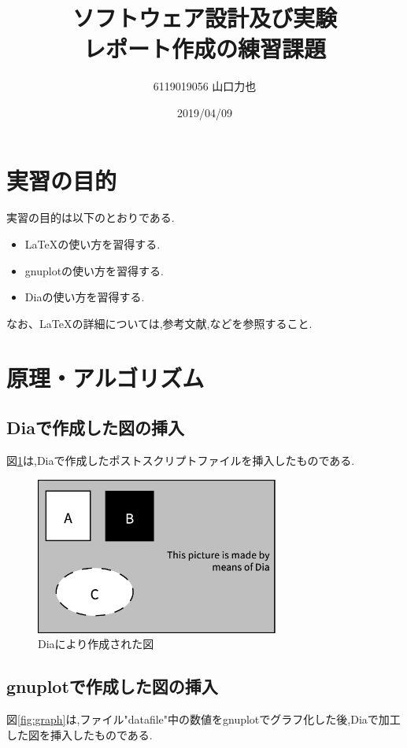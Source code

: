 \documentclass{jarticle}
\title{ソフトウェア設計及び実験\\レポート作成の練習課題}
\author{6119019056 山口力也}
\date{2019/04/09}
\begin{document}
\maketitle

\section{実習の目的}
実習の目的は以下のとおりである.\\
\begin{itemize}

\item \LaTeX の使い方を習得する.
\item gnuplotの使い方を習得する.
\item Diaの使い方を習得する.

\end{itemize}
なお、\LaTeX の詳細については,参考文献\cite{okumura},\cite{matsuda}などを参照すること.


\section{原理・アルゴリズム}
\subsection{Diaで作成した図の挿入}
図\ref{fig:dia}は,Diaで作成したポストスクリプトファイルを挿入したものである.


\begin{figure}
\begin{center}
\includegraphics[width=8.0cm]{dia.eps}
\caption{Diaにより作成された図}
\label{fig:dia}
\end{center}
\end{figure}

\subsection{gnuplotで作成した図の挿入}
図\ref{fig:graph}は,ファイル"datafile"中の数値をgnuplotでグラフ化した後,Diaで加工した図を挿入したものである.
\end{document}

